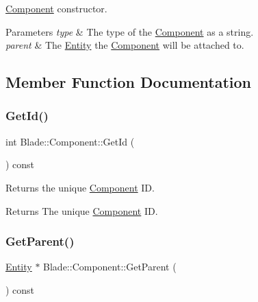 \hyperlink{class_blade_1_1_component}{Component} constructor. 


\begin{DoxyParams}{Parameters}
{\em type} & The type of the \hyperlink{class_blade_1_1_component}{Component} as a string. \\
\hline
{\em parent} & The \hyperlink{class_blade_1_1_entity}{Entity} the \hyperlink{class_blade_1_1_component}{Component} will be attached to. \\
\hline
\end{DoxyParams}


\subsection{Member Function Documentation}
\mbox{\label{class_blade_1_1_component_ab92acfebdc935b55b9275f0442d9c047}} 
\subsubsection{\texorpdfstring{Get\+Id()}{GetId()}}
{\footnotesize\ttfamily int Blade\+::\+Component\+::\+Get\+Id (\begin{DoxyParamCaption}{ }\end{DoxyParamCaption}) const\hspace{0.3cm}{\ttfamily [noexcept]}}



Returns the unique \hyperlink{class_blade_1_1_component}{Component} ID. 

\begin{DoxyReturn}{Returns}
The unique \hyperlink{class_blade_1_1_component}{Component} ID. 
\end{DoxyReturn}
\mbox{\label{class_blade_1_1_component_aadb58e9f58725b7022ee672124bc1518}} 
\subsubsection{\texorpdfstring{Get\+Parent()}{GetParent()}}
{\footnotesize\ttfamily \hyperlink{class_blade_1_1_entity}{Entity} $\ast$ Blade\+::\+Component\+::\+Get\+Parent (\begin{DoxyParamCaption}{ }\end{DoxyParamCaption}) const\hspace{0.3cm}{\ttfamily [noexcept]}}



